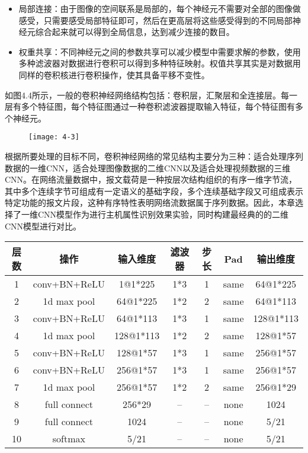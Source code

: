 \begin{itemize}
\item 局部连接：由于图像的空间联系是局部的，每个神经元不需要对全部的图像做感受，只需要感受局部特征即可，然后在更高层将这些感受得到的不同局部神经元综合起来就可以得到全局信息，达到减少连接的数目。

\item 权重共享：不同神经元之间的参数共享可以减少模型中需要求解的参数，使用多种滤波器对数据进行卷积可以得到多种特征映射。权值共享其实是对数据用同样的卷积核进行卷积操作，使其具备平移不变性。

\end{itemize}

如图4.4所示，一般的卷积神经网络结构包括：卷积层，汇聚层和全连接层。每一层有多个特征图，每个特征图通过一种卷积滤波器提取输入特征，每个特征图有多个神经元。

\begin{figure}[!htbp]
    \centering
    \texttt{[image: 4-3]}
    \label{fig:4-3}
\end{figure}

根据所要处理的目标不同，卷积神经网络的常见结构主要分为三种：适合处理序列数据的一维CNN，适合处理图像数据的二维CNN以及适合处理视频数据的三维CNN。在网络流量数据中，报文载荷是一种按层次结构组织的有序一维字节流，其中多个连续字节可组成有一定语义的基础字段，多个连续基础字段又可组成表示特定功能的报文片段，这种有序特性表明网络流数据属于序列数据。因此，本章选择了一维CNN模型作为进行主机属性识别效果实验，同时构建最经典的的二维CNN模型进行对比。

\begin{table}[!h]
    \centering
    \footnotesize
    \setlength{\tabcolsep}{8pt}
    \renewcommand{\arraystretch}{1}
\begin{tabular}{ccccccc}
\toprule
层数&操作&输入维度&滤波器&步长&Pad&输出维度\\
\midrule
1 & conv+BN+ReLU & 1@1*225 & 1*3 & 1 & same & 64@1*225 
\\ 
2 & 1d max pool & 64@1*225 & 1*2 & 2 & same & 64@1*113 
\\ 
3 & conv+BN+ReLU & 64@1*113 & 1*3 & 1 & same & 128@1*113
\\ 
4 & 1d max pool &128@1*113 & 1*2 & 2 & same & 128@1*57
\\ 
5 & conv+BN+ReLU & 128@1*57 & 1*3 & 1 & same & 256@1*57
\\ 
6 & conv+BN+ReLU & 256@1*57 & 1*3 & 1 & same & 256@1*57
\\ 
7 & 1d max pool & 256@1*57 & 1*2 & 2 & same & 256@1*29
\\
8 & full connect & 256*29 & -- & -- & none & 1024
\\
9 & full connect & 1024 & -- & -- & none & 5/21
\\ 
10 & softmax & 5/21 & -- & -- & none & 5/21
\\ 
\bottomrule
\end{tabular}
\end{table}

